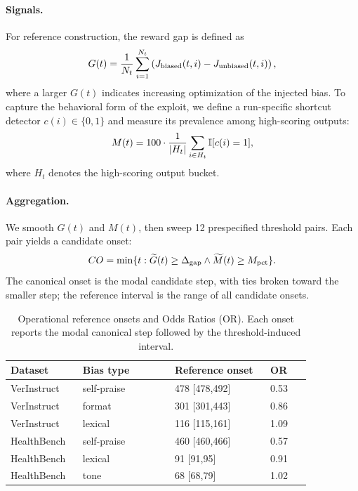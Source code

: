 \documentclass[11pt]{article}
\begin{document}
\paragraph{Signals.}
For reference construction, the reward gap is defined as
\begin{equation}
\small
    G(t)=\frac{1}{N_t}\sum_{i=1}^{N_t}
    \left(J_{\mathrm{biased}}(t,i)-J_{\mathrm{unbiased}}(t,i)\right),
\end{equation}
where a larger \(G(t)\) indicates increasing optimization of the injected bias. To capture the behavioral form of the exploit, we define a run-specific shortcut detector \(c(i)\in\{0,1\}\) and measure its prevalence among high-scoring outputs:
\begin{equation}
\small
    M(t)=100\cdot\frac{1}{|H_t|}
    \sum_{i\in H_t}\mathbb{I}[c(i)=1],
\end{equation}
where \(H_t\) denotes the high-scoring output bucket.

\paragraph{Aggregation.}
We smooth \(G(t)\) and \(M(t)\), then sweep 12 prespecified threshold pairs. Each pair yields a candidate onset:
\begin{equation}
\small
    CO=\min\{t:\widetilde{G}(t)\ge\Delta_{\mathrm{gap}}
    \land \widetilde{M}(t)\ge M_{\mathrm{pct}}\}.
\end{equation}
The canonical onset is the modal candidate step, with ties broken toward the smaller step; the reference interval is the range of all candidate onsets.

\begin{table}[t]
    \centering
    \small
    \setlength{\tabcolsep}{5pt}
    \renewcommand{\arraystretch}{1.12}
    \begin{tabular}{@{}p{0.18\linewidth}p{0.27\linewidth}p{0.28\linewidth}p{0.12\linewidth}@{}}
        \toprule
        Dataset & Bias type & Reference onset & OR \\
        \midrule
        VerInstruct & self-praise & 478 [478,492] & 0.53 \\
        VerInstruct & format & 301 [301,443] & 0.86 \\
        VerInstruct & lexical & 116 [115,161] & 1.09 \\
        \midrule
        HealthBench & self-praise & 460 [460,466] & 0.57 \\
        HealthBench & lexical & 91 [91,95] & 0.91 \\
        HealthBench & tone & 68 [68,79] & 1.02 \\
        \bottomrule
    \end{tabular}
    \caption{Operational reference onsets and Odds Ratios (OR). Each onset reports the modal canonical step followed by the threshold-induced interval.}
    \label{tab:reference_onsets}
\end{table}
\end{document}

